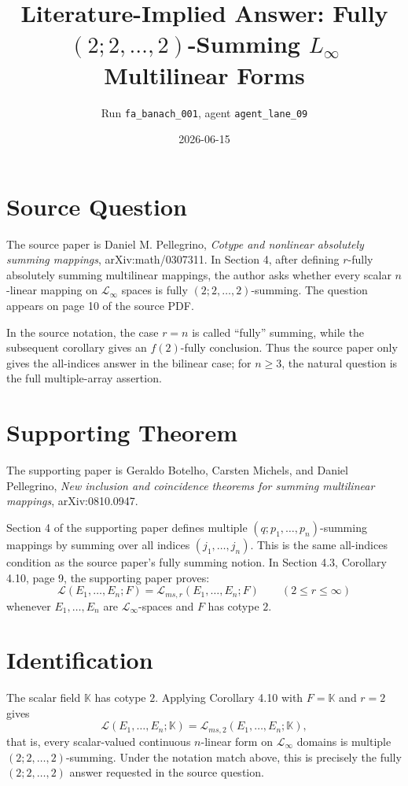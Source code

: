 \documentclass[11pt]{article}
\title{Literature-Implied Answer: Fully \((2;2,\ldots,2)\)-Summing \(L_\infty\) Multilinear Forms}
\author{Run \texttt{fa\_banach\_001}, agent \texttt{agent\_lane\_09}}
\date{2026-06-15}
\begin{document}
\maketitle

\section*{Source Question}

The source paper is Daniel M. Pellegrino, \emph{Cotype and nonlinear absolutely
summing mappings}, arXiv:math/0307311.  In Section 4, after defining
\(r\)-fully absolutely summing multilinear mappings, the author asks whether
every scalar \(n\)-linear mapping on \(\mathcal L_\infty\) spaces is fully
\((2;2,\ldots,2)\)-summing.  The question appears on page 10 of the source
PDF.

In the source notation, the case \(r=n\) is called ``fully'' summing, while the
subsequent corollary gives an \(f(2)\)-fully conclusion.  Thus the source paper
only gives the all-indices answer in the bilinear case; for \(n\geq 3\), the
natural question is the full multiple-array assertion.

\section*{Supporting Theorem}

The supporting paper is Geraldo Botelho, Carsten Michels, and Daniel
Pellegrino, \emph{New inclusion and coincidence theorems for summing
multilinear mappings}, arXiv:0810.0947.

Section 4 of the supporting paper defines multiple
\((q;p_1,\ldots,p_n)\)-summing mappings by summing over all indices
\((j_1,\ldots,j_n)\).  This is the same all-indices condition as the source
paper's fully summing notion.  In Section 4.3, Corollary 4.10, page 9, the
supporting paper proves:
\[
  \mathcal L(E_1,\ldots,E_n;F)
  =
  \mathcal L_{ms,r}(E_1,\ldots,E_n;F)
  \qquad (2\leq r\leq\infty)
\]
whenever \(E_1,\ldots,E_n\) are \(\mathcal L_\infty\)-spaces and \(F\) has
cotype \(2\).

\section*{Identification}

The scalar field \(\mathbb K\) has cotype \(2\).  Applying Corollary 4.10 with
\(F=\mathbb K\) and \(r=2\) gives
\[
  \mathcal L(E_1,\ldots,E_n;\mathbb K)
  =
  \mathcal L_{ms,2}(E_1,\ldots,E_n;\mathbb K),
\]
that is, every scalar-valued continuous \(n\)-linear form on
\(\mathcal L_\infty\) domains is multiple \((2;2,\ldots,2)\)-summing.  Under
the notation match above, this is precisely the fully \((2;2,\ldots,2)\)
answer requested in the source question.
\end{document}
